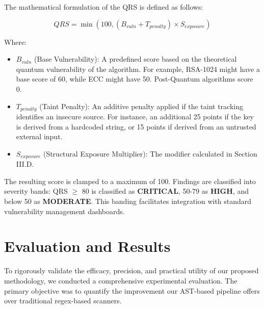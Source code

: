 \documentclass[conference]{IEEEtran}
\begin{document}
The mathematical formulation of the QRS is defined as follows:

\begin{equation}
QRS = \min \left( 100, ( B_{vuln} + T_{penalty} ) \times S_{exposure} \right)
\end{equation}

Where:
\begin{itemize}
    \item $B_{vuln}$ (Base Vulnerability): A predefined score based on the theoretical quantum vulnerability of the algorithm. For example, RSA-1024 might have a base score of 60, while ECC might have 50. Post-Quantum algorithms score 0.
    \item $T_{penalty}$ (Taint Penalty): An additive penalty applied if the taint tracking identifies an insecure source. For instance, an additional 25 points if the key is derived from a hardcoded string, or 15 points if derived from an untrusted external input.
    \item $S_{exposure}$ (Structural Exposure Multiplier): The modifier calculated in Section III.D.
\end{itemize}
The resulting score is clamped to a maximum of 100. Findings are classified into severity bands: QRS $\geq$ 80 is classified as \textbf{CRITICAL}, 50-79 as \textbf{HIGH}, and below 50 as \textbf{MODERATE}. This banding facilitates integration with standard vulnerability management dashboards.

\section{Evaluation and Results}\label{sec:evaluation}

To rigorously validate the efficacy, precision, and practical utility of our proposed methodology, we conducted a comprehensive experimental evaluation. The primary objective was to quantify the improvement our AST-based pipeline offers over traditional regex-based scanners.
\end{document}
